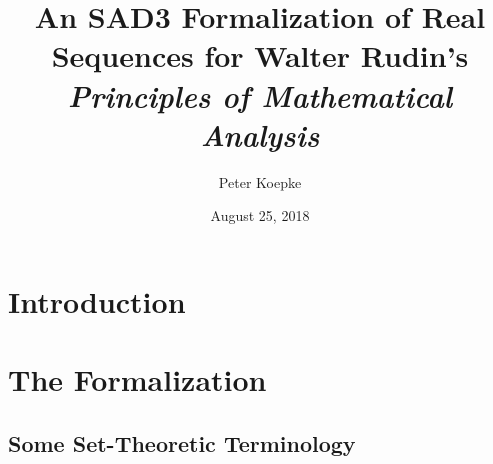 \documentclass{article}
\begin{document}
\title{An SAD3 Formalization of Real Sequences for Walter Rudin's
\it{Principles of Mathematical Analysis}}

\author{Peter Koepke}

\date{August 25, 2018}

\maketitle


\section{Introduction}


\section{The Formalization}
\subsection{Some Set-Theoretic Terminology}
\end{document}
